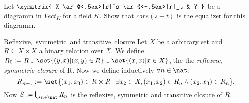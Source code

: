 \begin{exercise}
  Let
  $\xymatrix{
      X \ar@<.5ex>[r]^s \ar@<-.5ex>[r]_t & Y
  }$
  be a diagramm in $Vect_K$ for a field $K$. Show that $core(s-t)$ is the equalizer for this diagramm.
\end{exercise}

\begin{definition}{Reflexive,\ symmetric\ and transitive\ closure}
  Let $X$ be a arbitrary set and $R \subseteq X \times X$ a binary relation over $X$.
  We define $R_0 := R \cup \set{ (y, x) | (x, y) \in R} \cup \set{ (x, x) | x \in X}$,
  the the \emph{reflexive, symmetric closure} of R.
  Now we define inductively $\forall n \in \nat$:
  \[R_{n+1} := \set{(x_1, x_3) \in R \times R \; | \; \exists x_2 \in X, (x_1, x_2) \in R_n \land (x_2, x_3) \in R_n}.\]
  Now $S := \bigcup_{n \in \nat}{R_n}$ is the reflexive, symmetric and transitive closure of $R$.
\end{definition}

